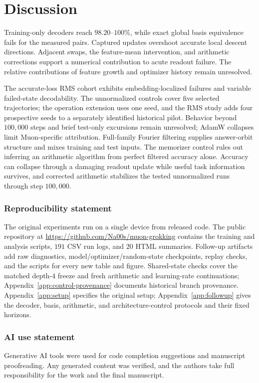 \documentclass{article}
\begin{document}
\section{Discussion}
\label{sec:discussion}

Training-only decoders reach $98.20$--$100\%$, while exact global basis equivalence fails for the measured pairs. Captured updates overshoot accurate local descent directions. Adjacent swaps, the feature-mean intervention, and arithmetic corrections support a numerical contribution to acute readout failure. The relative contributions of feature growth and optimizer history remain unresolved.

The accurate-loss RMS cohort exhibits embedding-localized failures and variable failed-state decodability. The unnormalized controls cover five selected trajectories; the operation extension uses one seed, and the RMS study adds four prospective seeds to a separately identified historical pilot. Behavior beyond $100{,}000$ steps and brief test-only excursions remain unresolved; AdamW collapses limit Muon-specific attribution. Full-family Fourier filtering supplies answer-orbit structure and mixes training and test inputs. The memorizer control rules out inferring an arithmetic algorithm from perfect filtered accuracy alone. Accuracy can collapse through a damaging readout update while useful task information survives, and corrected arithmetic stabilizes the tested unnormalized runs through step $100{,}000$.

\label{sec:main-end}

\subsubsection*{Reproducibility statement}
The original experiments run on a single device from released code. The public repository at \url{https://github.com/Na00s/muon-grokking} contains the training and analysis scripts, $191$ CSV run logs, and $20$ HTML summaries. Follow-up artifacts add raw diagnostics, model/optimizer/random-state checkpoints, replay checks, and the scripts for every new table and figure. Shared-state checks cover the matched depth-$4$ freeze and fresh arithmetic and learning-rate continuations; Appendix~\ref{app:control-provenance} documents historical branch provenance. Appendix~\ref{app:setup} specifies the original setup; Appendix~\ref{app:followup} gives the decoder, basis, arithmetic, and architecture-control protocols and their fixed horizons.

\subsubsection*{AI use statement}
Generative AI tools were used for code completion suggestions and manuscript proofreading. Any generated content was verified, and the authors take full responsibility for the work and the final manuscript.

\clearpage



\clearpage
\appendix


\clearpage

\clearpage

\end{document}
